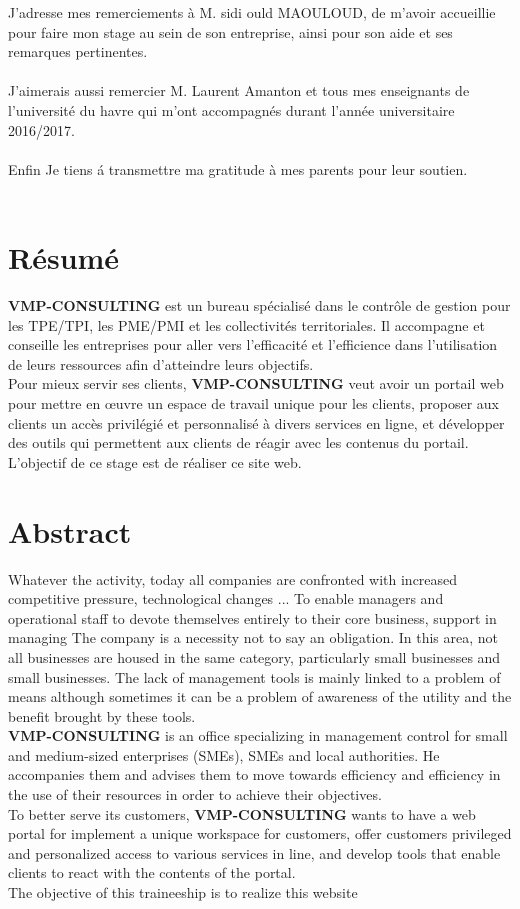 \documentclass[12pt]{article}
\begin{document}
J’adresse mes remerciements à  M. sidi ould MAOULOUD, de m’avoir accueillie pour faire mon
stage au sein de son entreprise, ainsi pour son aide et  ses  remarques pertinentes.  \\ \\
J’aimerais aussi remercier M. Laurent Amanton  et tous mes enseignants de l’université du havre
qui m’ont accompagnés 
durant l'année universitaire 2016/2017.\\ \\

Enfin  Je tiens á transmettre ma gratitude à mes
parents  pour  leur soutien.\\ \\


\newpage

\section*{Résumé}
\textbf{VMP-CONSULTING}  est un bureau spécialisé dans le contrôle de gestion pour les TPE/TPI, les PME/PMI et les collectivités territoriales. Il  accompagne et conseille les entreprises pour aller vers l'efficacité et l'efficience dans l'utilisation de leurs ressources afin d'atteindre leurs objectifs.\\
Pour mieux servir ses clients, \textbf{VMP-CONSULTING}  veut avoir un portail web pour 
mettre en œuvre un espace de travail unique pour les clients, 
 proposer aux clients un accès privilégié et personnalisé à divers services en
ligne, et 
développer des outils qui permettent aux clients de réagir avec les contenus du
portail.\\
L'objectif de ce stage est de réaliser ce site web.


\section*{Abstract}
Whatever the activity, today all companies are confronted with increased competitive pressure, technological changes ... To enable managers and operational staff to devote themselves entirely to their core business, support in managing The company is a necessity not to say an obligation. In this area, not all businesses are housed in the same category, particularly small businesses and small businesses. The lack of management tools is mainly linked to a problem of means although sometimes it can be a problem of awareness of the utility and the benefit brought by these tools.\\
\textbf{VMP-CONSULTING}  is an office specializing in management control for small and medium-sized enterprises (SMEs), SMEs and local authorities. He accompanies them and advises them to move towards efficiency and efficiency in the use of their resources in order to achieve their objectives.\\
To better serve its customers, \textbf{VMP-CONSULTING}  wants to have a web portal for
implement a unique workspace for customers,
 offer customers privileged and personalized access to various services in
line, and
develop tools that enable clients to react with the contents of the
portal.\\
The objective of this traineeship is to realize this website
\end{document}
